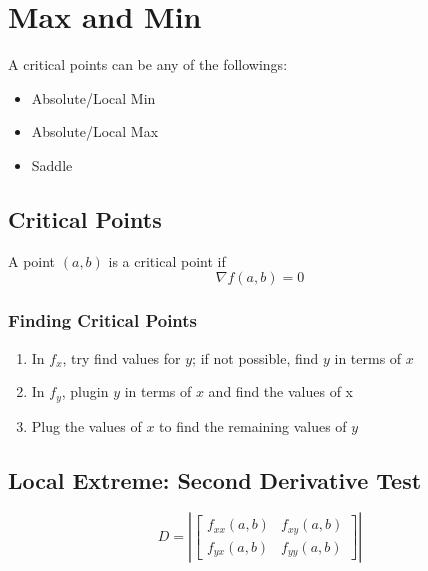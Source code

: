 \section{Max and Min}

  A critical points can be any of the followings:
  \begin{itemize}
    \item Absolute/Local Min
    \item Absolute/Local Max
    \item Saddle
  \end{itemize}

  \subsection{Critical Points}

    A point $ \left( a, b \right) $ is a critical point if
    \begin{equation}
      \nabla f \left( a, b \right) = 0
    \end{equation}

    \subsubsection{Finding Critical Points}

      \begin{enumerate}
        \item In $ f_{x} $, try find values for $ y $; if not possible,
        find $ y $ in terms of $ x $
        \item In $ f_{y} $, plugin $ y $ in terms of $ x $ and find the values
        of x
        \item Plug the values of $ x $ to find the remaining values of $ y $
      \end{enumerate}

  \subsection{Local Extreme: Second Derivative Test}

    \begin{equation}
      D =
      \left|
        \begin{bmatrix}
          f_{xx} (a, b) & f_{xy} (a, b) \\
          f_{yx} (a, b) & f_{yy} (a, b)
        \end{bmatrix}
      \right|
    \end{equation}

